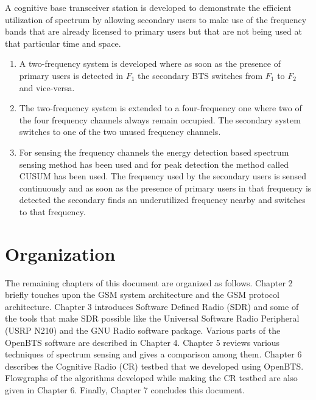 A cognitive base transceiver station is developed to demonstrate the efficient 
utilization of spectrum by allowing secondary users to make use of the 
frequency bands that are already licensed to primary users but that are not 
being used at that particular time and space.

\begin{enumerate}
    \item A two-frequency system is developed where as soon as the presence of 
    primary users is detected in $F_1$  the secondary BTS switches from $F_1$ 
    to $F_2$ and vice-versa.
    \item The two-frequency system is extended to a four-frequency one where
    two of the four frequency channels always remain occupied. The secondary
    system switches to one of the two unused frequency channels.
    \item For sensing the frequency channels the energy detection based
    spectrum sensing method has been used and for peak detection the method 
    called CUSUM has been used. The frequency used by the secondary users is
    sensed continuously and as soon as the presence of primary users in that 
    frequency is detected the secondary finds an underutilized frequency 
    nearby and switches to that frequency.  
\end{enumerate}



\section{Organization}
The remaining chapters of this document are organized as follows. Chapter 2 
briefly touches upon the GSM system architecture and the GSM protocol 
architecture. Chapter 3 introduces Software Defined Radio (SDR) and some of the
tools that make SDR possible like the Universal Software Radio Peripheral 
(USRP N210) and the GNU Radio software package. Various parts of the OpenBTS 
software are described in Chapter 4. Chapter 5 reviews various techniques of 
spectrum sensing and gives a comparison among them. Chapter 6 describes the 
Cognitive Radio (CR) testbed that we developed using OpenBTS. Flowgraphs of
the algorithms developed while making the CR testbed are also given in
Chapter 6. Finally, Chapter 7 concludes this document.

